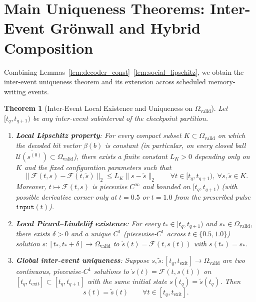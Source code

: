 \documentclass[11pt,a4paper]{article}
\newtheorem{theorem}{Theorem}[section]
\theoremstyle{definition}
\begin{document}
\section{Main Uniqueness Theorems: Inter-Event Gr\"onwall and Hybrid Composition}

Combining Lemmas~\ref{lem:decoder_const}--\ref{lem:social_lipschitz}, we obtain the inter-event uniqueness theorem and its extension across scheduled memory-writing events.

\begin{theorem}[Inter-Event Local Existence and Uniqueness on $\Omega_{\mathrm{valid}}$]
\label{thm:inter_event}
Let $[t_q, t_{q+1})$ be any inter-event subinterval of the checkpoint partition.
\begin{enumerate}
  \item \textbf{Local Lipschitz property}: For every compact subset $K \subset \Omega_{\mathrm{valid}}$ on which the decoded bit vector $\beta(b)$ is constant (in particular, on every closed ball $\overline{\mathcal{U}(s^{(0)})} \subset \Omega_{\mathrm{valid}}$), there exists a finite constant $L_K > 0$ depending only on $K$ and the fixed configuration parameters such that
  \begin{equation}
    \|\mathcal{F}(t, s) - \mathcal{F}(t, \widetilde{s})\|_2 \le L_K \|s - \widetilde{s}\|_2 \qquad \forall t \in [t_q, t_{q+1}),\ \forall s, \widetilde{s} \in K.
  \end{equation}
  Moreover, $t \mapsto \mathcal{F}(t, s)$ is piecewise $C^\infty$ and bounded on $[t_q, t_{q+1})$ (with possible derivative corner only at $t = 0.5$ or $t = 1.0$ from the prescribed pulse $\texttt{input}(t)$).
  \item \textbf{Local Picard--Lindel\"of existence}: For every $t_* \in [t_q, t_{q+1})$ and $s_* \in \Omega_{\mathrm{valid}}$, there exists $\delta > 0$ and a unique $C^1$ (piecewise-$C^1$ across $t \in \{0.5, 1.0\}$) solution $s : [t_*, t_* + \delta] \to \Omega_{\mathrm{valid}}$ to $\dot{s}(t) = \mathcal{F}(t, s(t))$ with $s(t_*) = s_*$.
  \item \textbf{Global inter-event uniqueness}: Suppose $s, \widetilde{s} : [t_q, t_{\mathrm{exit}}] \to \Omega_{\mathrm{valid}}$ are two continuous, piecewise-$C^1$ solutions to $\dot{s}(t) = \mathcal{F}(t, s(t))$ on $[t_q, t_{\mathrm{exit}}] \subset [t_q, t_{q+1}]$ with the same initial state $s(t_q) = \widetilde{s}(t_q)$. Then
  \begin{equation}
    s(t) = \widetilde{s}(t) \qquad \forall t \in [t_q, t_{\mathrm{exit}}].
  \end{equation}
\end{enumerate}
\end{theorem}
\end{document}
